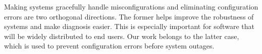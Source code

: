 Making systems gracefully handle misconfigurations and eliminating
configuration errors are two orthogonal directions.
The former helps improve the robustness of systems and make 
diagnosis easier. This is especially important for 
software that will be widely distributed to end users.
Our work belongs to the latter case, which is used to 
prevent configuration errors before system outages.
